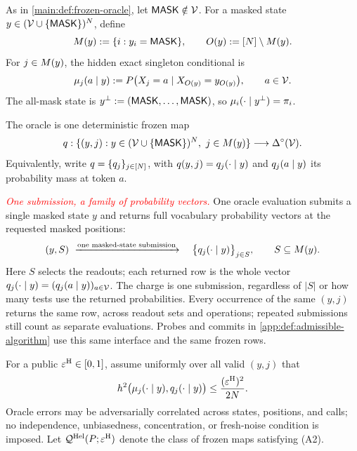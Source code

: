 \begin{definition}
\label{app:def:frozen-oracle}
As in \cref{main:def:frozen-oracle}, let $\MASK\notin\Vocab$. For a masked state
$y\in(\Vocab\cup\{\MASK\})^N$, define
\begin{equation}
 \MaskSet{y}:=\{i:y_i=\MASK\},
 \qquad
 \ObservedSet{y}:=\PositionSet\setminus\MaskSet{y}.
 \label{app:eq:masked-revealed}
\end{equation}
For $j\in\MaskSet{y}$, the hidden exact singleton conditional is
\begin{equation}
 \ExactRowMass{y}{j}{a}
 :=\TargetLaw\bigl(X_j=a\mid
 X_{\ObservedSet{y}}=y_{\ObservedSet{y}}\bigr),
 \qquad a\in\Vocab.
 \label{app:eq:exact-row}
\end{equation}
The all-mask state is $\AllMaskState:=(\MASK,\ldots,\MASK)$, so
$\ExactRow{\AllMaskState}{i}=\PosMarginal{i}$.

The oracle is one deterministic frozen map
\begin{equation}
 \FrozenOracle:\{(y,j):y\in(\Vocab\cup\{\MASK\})^N,
                 \ j\in\MaskSet{y}\}
 \longrightarrow\Delta^\circ(\Vocab).
 \label{app:eq:oracle-type}
\end{equation}
Equivalently, write
$\FrozenOracle=\{\FrozenOracle_j\}_{j\in\PositionSet}$, with
$\FrozenOracle(y,j)=\OracleRow{y}{j}$ and
$\OracleRowMass{y}{j}{a}$ its probability mass at token $a$.

\emph{\textcolor{red}{One submission, a family of probability vectors.}}
One oracle evaluation submits a single masked state $y$ and returns full
vocabulary probability vectors at the requested masked positions:
\[
 (y,S)\ \xrightarrow{\text{one masked-state submission}}\quad
 \bigl\{\OracleRow{y}{j}\bigr\}_{j\in S},
 \qquad S\subseteq\MaskSet{y}.
\]
Here $S$ selects the readouts; each returned row is the whole vector
$\OracleRow{y}{j}=(\OracleRowMass{y}{j}{a})_{a\in\Vocab}$.
The charge is one submission, regardless of $|S|$ or how many tests use
the returned probabilities. Every occurrence of the same $(y,j)$ returns
the same row, across readout sets and operations; repeated submissions
still count as separate evaluations.
Probes and commits in \cref{app:def:admissible-algorithm} use this same
interface and the same frozen rows.
\end{definition}

\begin{assumption}
\label{app:ass:oracle-accuracy}
For a public $\OracleRadius\in[0,1]$, assume uniformly over all valid $(y,j)$ that
\begin{equation}
 \sqHellinger\bigl(\ExactRow{y}{j},\OracleRow{y}{j}\bigr)
 \le \frac{(\OracleRadius)^2}{2N}.
 \label{app:eq:A2}
\end{equation}
Oracle errors may be adversarially correlated across states, positions, and
calls; no independence, unbiasedness, concentration, or fresh-noise condition
is imposed.  Let $\OracleClass(\TargetLaw;\OracleRadius)$ denote the class
of frozen maps satisfying (A2).
\end{assumption}

